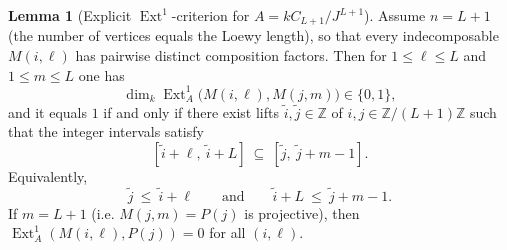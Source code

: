 \documentclass{article}
\newcommand{\Ext}{\operatorname{Ext}}
\theoremstyle{definition}
\newtheorem{lemma}[theorem]{Lemma}
\begin{document}

\begin{lemma}[Explicit $\Ext^1$-criterion for $A=kC_{L+1}/J^{L+1}$]\label{lem:ext1_criterion_cycle}
Assume $n=L+1$ (the number of vertices equals the Loewy length), so that every indecomposable $M(i,\ell)$
has pairwise distinct composition factors. Then for $1\le \ell\le L$ and $1\le m\le L$ one has
\[
\dim_k\Ext_A^1\!\big(M(i,\ell),M(j,m)\big)\in\{0,1\},
\]
and it equals $1$ if and only if there exist lifts $\tilde i,\tilde j\in\mathbb{Z}$ of $i,j\in\mathbb{Z}/(L+1)\mathbb{Z}$
such that the integer intervals satisfy
\[
[\tilde i+\ell,\ \tilde i+L]\ \subseteq\ [\tilde j,\ \tilde j+m-1].
\]
Equivalently,
\[
\tilde j\ \le\ \tilde i+\ell
\qquad\text{and}\qquad
\tilde i+L\ \le\ \tilde j+m-1.
\]
If $m=L+1$ (i.e. $M(j,m)=P(j)$ is projective), then $\Ext_A^1(M(i,\ell),P(j))=0$ for all $(i,\ell)$.
\end{lemma}
\end{document}
